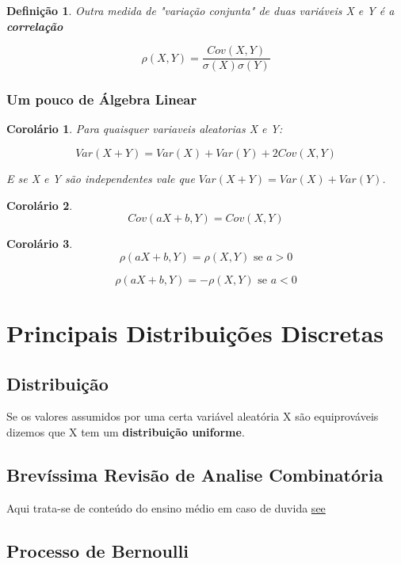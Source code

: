 \documentclass[12pt]{article}
\newtheorem{corollary}{Corolário}[theorem]
\newtheorem{definition}{Definição}
\begin{document}
\begin{definition}
    Outra medida de "variação conjunta" de duas variáveis X e Y é a \textbf{correlação}
    
    $$\rho (X, Y) = \dfrac{Cov (X, Y)}{\sigma (X) \sigma(Y)}$$
\end{definition}

\subsubsection*{Um pouco de Álgebra Linear}
\begin{corollary}
    Para quaisquer variaveis aleatorias X e Y:
    
    $$Var(X + Y) = Var(X) + Var(Y) + 2 Cov (X, Y)$$
    
    E se X e Y são independentes vale que $Var(X + Y) = Var(X) + Var(Y)$.
\end{corollary}

\begin{corollary}
    $$Cov (aX + b, Y) = Cov (X, Y)$$
\end{corollary}

\begin{corollary}
    $$\rho (a X + b, Y) = \rho (X, Y) \text{ se } a > 0$$
    
    $$\rho (a X + b, Y) = - \rho (X, Y) \text{ se } a < 0$$
\end{corollary}

\section{Principais Distribuições Discretas}
\subsection{Distribuição}
Se os valores assumidos por uma certa variável aleatória X são equiprováveis dizemos que X tem um \textbf{distribuição uniforme}.

\subsection{Brevíssima Revisão de Analise Combinatória}
Aqui trata-se de conteúdo do ensino médio em caso de duvida \href{https://pt.wikipedia.org/wiki/Combinat\%C3\%B3ria}{see}

\subsection{Processo de Bernoulli}
\end{document}
